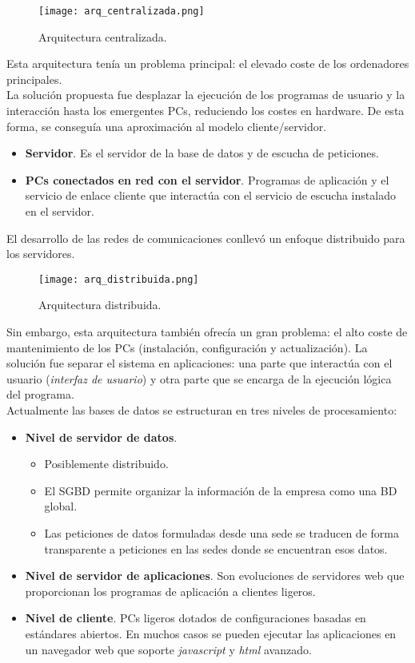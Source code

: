 \documentclass[12pt,spanish]{article}
\numberwithin{definition}{subsection}
\begin{document}
\begin{figure}[H]
\centering
\texttt{[image: arq\_centralizada.png]}
\caption{Arquitectura centralizada.}
\end{figure}

Esta arquitectura tenía un problema principal: el elevado coste de los ordenadores principales.\\
La solución propuesta fue desplazar la ejecución de los programas de usuario y la interacción hasta los emergentes PCs, reduciendo los costes en hardware. De esta forma, se conseguía una aproximación al modelo cliente/servidor.\\

\begin{itemize}
	\item \textbf{Servidor}. Es el servidor de la base de datos y de escucha de peticiones.
	\item \textbf{PCs conectados en red con el servidor}. Programas de aplicación y el servicio de enlace cliente que interactúa con el servicio de escucha instalado en el servidor.
\end{itemize}

El desarrollo de las redes de comunicaciones conllevó un enfoque distribuido para los servidores.

\begin{figure}[H]
\centering
\texttt{[image: arq\_distribuida.png]}
\caption{Arquitectura distribuida.}
\end{figure}

Sin embargo, esta arquitectura también ofrecía un gran problema: el alto coste de mantenimiento de los PCs (instalación, configuración y actualización). La solución fue separar el sistema en aplicaciones: una parte que interactúa con el usuario (\textit{interfaz de usuario}) y otra parte que se encarga de la ejecución lógica del programa.\\

Actualmente las bases de datos se estructuran en tres niveles de procesamiento:

\begin{itemize}
	\item \textbf{Nivel de servidor de datos}.
		\begin{itemize}
			\item Posiblemente distribuido.
			\item El SGBD permite organizar la información de la empresa como una BD global.
			\item Las peticiones de datos formuladas desde una sede se traducen de forma transparente a peticiones en las sedes donde se encuentran esos datos.
		\end{itemize}
		\item \textbf{Nivel de servidor de aplicaciones}. Son evoluciones de servidores web que proporcionan los programas de aplicación a clientes ligeros.
		\item \textbf{Nivel de cliente}. PCs ligeros dotados de configuraciones basadas en estándares abiertos. En muchos casos se pueden ejecutar las aplicaciones en un navegador web que soporte \textit{javascript} y \textit{html} avanzado.
\end{itemize}
\end{document}
